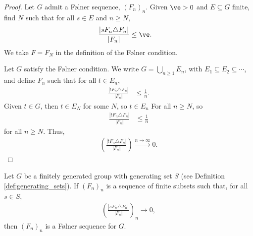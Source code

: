 \begin{proof}
  Let $G$ admit a Følner sequence, $\left(F_n\right)_n$. Given $\ve > 0$ and $E\subseteq G$ finite, find $N$ such that for all $s\in E$ and $n\geq N$,
  \begin{align*}
    \frac{\left\vert sF_n\triangle F_n \right\vert}{\left\vert F_n \right\vert} &\leq \ve.
  \end{align*}
  We take $F = F_N$ in the definition of the Følner condition.\newline

  Let $G$ satisfy the Følner condition. We write $G = \bigcup_{n\geq 1}E_n$, with $E_1\subseteq E_2\subseteq \cdots$, and define $F_n$ such that for all $t\in E_n$,
  \begin{align*}
    \frac{\left\vert tF_n\triangle F_n \right\vert}{\left\vert F_n \right\vert} &\leq \frac{1}{n}.
  \end{align*}
  Given $t\in G$, then $t\in E_N$ for some $N$, so $t\in E_n$ For all $n\geq N$, so
  \begin{align*}
    \frac{\left\vert tF_n\triangle F_n \right\vert}{\left\vert F_n \right\vert} &\leq \frac{1}{n}
  \end{align*}
  for all $n\geq N$. Thus,
  \begin{align*}
    \left(\frac{\left\vert tF_n\triangle F_n \right\vert}{\left\vert F_n \right\vert}\right)\xrightarrow{n\rightarrow\infty}0.
  \end{align*}
\end{proof}
\begin{lemma}\label{lemma:folner_condition_generating_set}
  Let $G$ be a finitely generated group with generating set $S$ (see Definition \ref{def:generating_sets}). If $\left(F_n\right)_n$ is a sequence of finite subsets such that, for all $s\in S$,
  \begin{align*}
    \left(\frac{\left\vert sF_n\triangle F_n \right\vert}{\left\vert F_n \right\vert}\right)_n\rightarrow 0,
  \end{align*}
  then $\left(F_n\right)_n$ is a Følner sequence for $G$.
\end{lemma}
